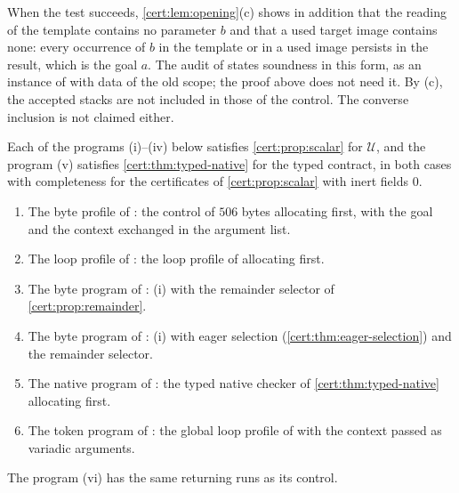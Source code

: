 When the test succeeds, \cref{cert:lem:opening}(c) shows in addition that the
reading of the template contains no parameter $b$ and that a used target image
contains none: every occurrence of $b$ in the template or in a used image
persists in the result, which is the goal $a$. The audit of
 states soundness in this form, as an instance of
 with data of the old scope; the proof above does not need it.
By (c), the accepted stacks are not included in those of the control. The
converse inclusion is not claimed either.

\begin{proposition}[Compositions]\label{cert:prop:compositions}
Each of the programs (i)--(iv) below satisfies \cref{cert:prop:scalar} for
$\mathcal U$, and the program (v) satisfies \cref{cert:thm:typed-native} for
the typed contract, in both cases with completeness for the certificates of
\cref{cert:prop:scalar} with inert fields $0$.
\begin{enumerate}[label=(\roman*)]
\item The byte profile of : the control of $506$ bytes
allocating first, with the goal and the context exchanged in the argument
list.
\item The loop profile of : the loop profile of
 allocating first.
\item The byte program of : (i) with the remainder selector
of \cref{cert:prop:remainder}.
\item The byte program of : (i) with eager selection
(\cref{cert:thm:eager-selection}) and the remainder selector.
\item The native program of : the typed native checker of
\cref{cert:thm:typed-native} allocating first.
\item The token program of : the global loop profile of
 with the context passed as variadic arguments.
\end{enumerate}
The program (vi) has the same returning runs as its control.
\end{proposition}
